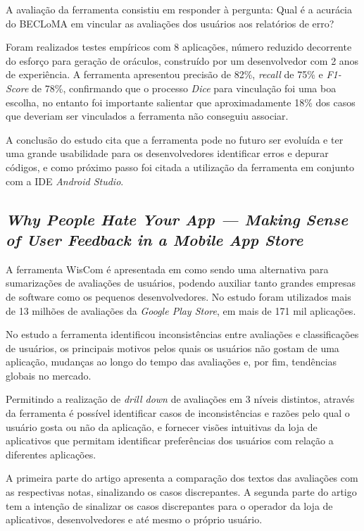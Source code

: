A avaliação da ferramenta consistiu em responder à pergunta: Qual é a acurácia do BECLoMA em vincular as avaliações dos usuários aos relatórios de erro?

Foram realizados testes empíricos com 8 aplicações, número reduzido decorrente do esforço para geração de oráculos, construído por um desenvolvedor com 2 anos de experiência. A ferramenta apresentou precisão de 82\%, \textit{recall} de 75\% e \textit{F1-Score} de 78\%, confirmando que o processo \textit{Dice} para vinculação foi uma boa escolha, no entanto foi importante salientar que aproximadamente 18\% dos casos que deveriam ser vinculados a ferramenta não conseguiu associar.

A conclusão do estudo cita que a ferramenta pode no futuro ser evoluída e ter uma grande usabilidade para os desenvolvedores identificar erros e depurar códigos, e como próximo passo foi citada a utilização da ferramenta em conjunto com a IDE \textit{Android Studio}.

\subsection{\textit{Why People Hate Your App — Making Sense of User Feedback in a Mobile App Store}}

A ferramenta WisCom é apresentada em \cite{Fu2013whypeoplehate} como sendo uma alternativa para sumarizações de avaliações de usuários, podendo auxiliar tanto grandes empresas de software como os pequenos desenvolvedores. No estudo foram utilizados mais de 13 milhões de avaliações da \textit{Google Play Store}, em mais de 171 mil aplicações.

No estudo a ferramenta identificou inconsistências entre avaliações e classificações de usuários, os principais motivos pelos quais os usuários não gostam de uma aplicação, mudanças ao longo do tempo das avaliações e, por fim, tendências globais no mercado.

Permitindo a realização de \textit{drill down} de avaliações em 3 níveis distintos, através da ferramenta é possível identificar casos de inconsistências e razões pelo qual o usuário gosta ou não da aplicação, e fornecer visões intuitivas da loja de aplicativos que permitam identificar preferências dos usuários com relação a diferentes aplicações.

A primeira parte do artigo apresenta a comparação dos textos das avaliações com as respectivas notas, sinalizando os casos discrepantes.
A segunda parte do artigo tem a intenção de sinalizar os casos discrepantes para o operador da loja de aplicativos, desenvolvedores e até mesmo o próprio usuário.

